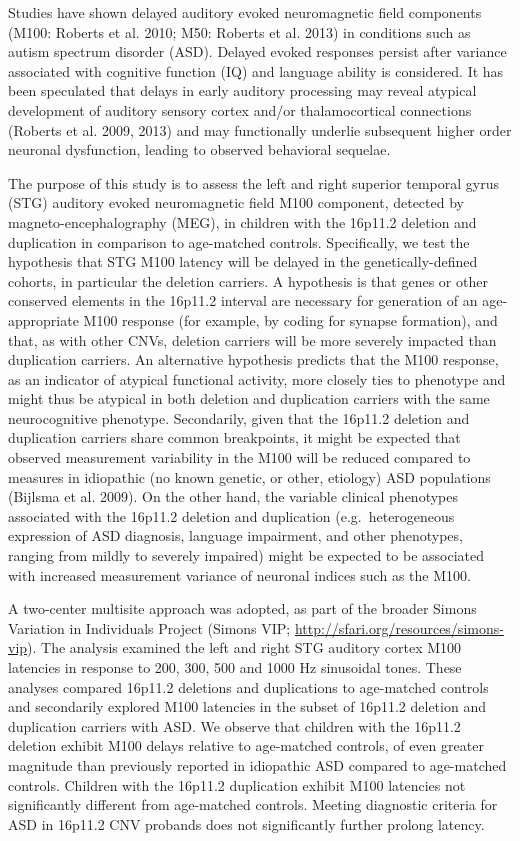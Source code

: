 \documentclass[]{article}
\begin{document}
Studies have shown delayed auditory evoked neuromagnetic field
components (M100: Roberts et al. 2010; M50: Roberts et al. 2013) in
conditions such as autism spectrum disorder (ASD). Delayed evoked
responses persist after variance associated with cognitive function (IQ)
and language ability is considered. It has been speculated that delays
in early auditory processing may reveal atypical development of auditory
sensory cortex and/or thalamocortical connections (Roberts et al. 2009,
2013) and may functionally underlie subsequent higher order neuronal
dysfunction, leading to observed behavioral sequelae.

The purpose of this study is to assess the left and right superior
temporal gyrus (STG) auditory evoked neuromagnetic field M100 component,
detected by magneto-encephalography (MEG), in children with the 16p11.2
deletion and duplication in comparison to age-matched controls.
Specifically, we test the hypothesis that STG M100 latency will be
delayed in the genetically-defined cohorts, in particular the deletion
carriers. A hypothesis is that genes or other conserved elements in the
16p11.2 interval are necessary for generation of an age-appropriate M100
response (for example, by coding for synapse formation), and that, as
with other CNVs, deletion carriers will be more severely impacted than
duplication carriers. An alternative hypothesis predicts that the M100
response, as an indicator of atypical functional activity, more closely
ties to phenotype and might thus be atypical in both deletion and
duplication carriers with the same neurocognitive phenotype.
Secondarily, given that the 16p11.2 deletion and duplication carriers
share common breakpoints, it might be expected that observed measurement
variability in the M100 will be reduced compared to measures in
idiopathic (no known genetic, or other, etiology) ASD populations
(Bijlsma et al. 2009). On the other hand, the variable clinical
phenotypes associated with the 16p11.2 deletion and duplication
(e.g.~heterogeneous expression of ASD diagnosis, language impairment,
and other phenotypes, ranging from mildly to severely impaired) might be
expected to be associated with increased measurement variance of
neuronal indices such as the M100.

A two-center multisite approach was adopted, as part of the broader
Simons Variation in Individuals Project (Simons VIP;
\url{http://sfari.org/resources/simons-vip}). The analysis examined the
left and right STG auditory cortex M100 latencies in response to 200,
300, 500 and 1000 Hz sinusoidal tones. These analyses compared 16p11.2
deletions and duplications to age-matched controls and secondarily
explored M100 latencies in the subset of 16p11.2 deletion and
duplication carriers with ASD. We observe that children with the 16p11.2
deletion exhibit M100 delays relative to age-matched controls, of even
greater magnitude than previously reported in idiopathic ASD compared to
age-matched controls. Children with the 16p11.2 duplication exhibit M100
latencies not significantly different from age-matched controls. Meeting
diagnostic criteria for ASD in 16p11.2 CNV probands does not
significantly further prolong latency.
\end{document}
